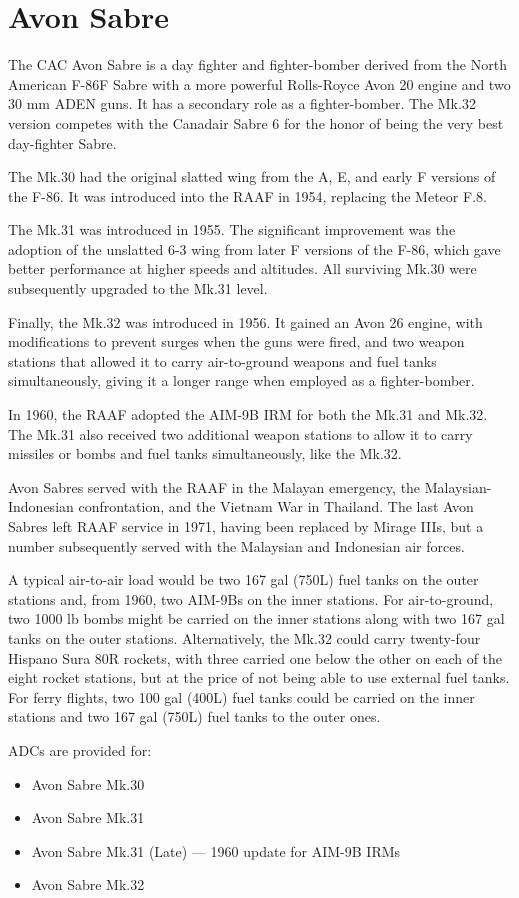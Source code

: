\section*{Avon Sabre}

The CAC Avon Sabre is a day fighter and fighter-bomber derived from the North American F-86F Sabre with a more powerful Rolls-Royce Avon 20 engine and two 30 mm ADEN guns. It has a secondary role as a fighter-bomber. The Mk.32 version competes with the Canadair Sabre 6 for the honor of being the very best day-fighter Sabre.

The Mk.30 had the original slatted wing from the A, E, and early F versions of the F-86. It was introduced into the RAAF in 1954, replacing the Meteor F.8.

The Mk.31 was introduced in 1955. The significant improvement was the adoption of the unslatted 6-3 wing from later F versions of the F-86, which gave better performance at higher speeds and altitudes. All surviving Mk.30 were subsequently upgraded to the Mk.31 level. 

Finally, the Mk.32 was introduced in 1956. It gained an Avon 26 engine, with modifications to prevent surges when the guns were fired, and two weapon stations that allowed it to carry air-to-ground weapons and fuel tanks simultaneously, giving it a longer range when employed as a fighter-bomber.

In 1960, the RAAF adopted the AIM-9B IRM for both the Mk.31 and Mk.32. The Mk.31 also received two additional weapon stations to allow it to carry missiles or bombs and fuel tanks simultaneously, like the Mk.32.

Avon Sabres served with the RAAF in the Malayan emergency, the Malaysian-Indonesian confrontation, and the Vietnam War in Thailand. The last Avon Sabres left RAAF service in 1971, having been replaced by Mirage IIIs, but a number subsequently served with the Malaysian and Indonesian air forces.

A typical air-to-air load would be two 167 gal (750L) fuel tanks on the outer stations and, from 1960, two AIM-9Bs on the inner stations. For air-to-ground, two 1000 lb bombs might be carried on the inner stations along with two 167 gal tanks on the outer stations. Alternatively, the Mk.32 could carry twenty-four Hispano Sura 80R rockets, with three carried one below the other on each of the eight rocket stations, but at the price of not being able to use external fuel tanks. For ferry flights, two 100 gal (400L) fuel tanks could be carried on the inner stations and two 167 gal (750L) fuel tanks to the outer ones.

ADCs are provided for:
\begin{itemize}
\item Avon Sabre Mk.30
\item Avon Sabre Mk.31
\item Avon Sabre Mk.31 (Late) –– 1960 update for AIM-9B IRMs
\item Avon Sabre Mk.32
\end{itemize}
